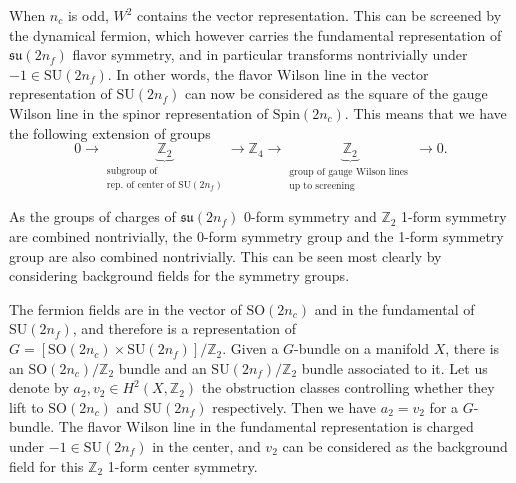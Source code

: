 \documentclass[12pt]{article}
\numberwithin{equation}{section}
\def\bZ{\mathbb{Z}}
\def\SU{\mathrm{SU}}
\def\SO{\mathrm{SO}}
\def\su{\mathfrak{su}}
\def\Spin{\mathrm{Spin}}
\begin{document}
When $n_c$ is odd, $W^2$ contains the vector representation.
This can be screened by the dynamical fermion, which however carries the fundamental representation of $\su(2n_f)$ flavor symmetry, 
and in particular transforms nontrivially under $-1\in \SU(2n_f)$.
In other words, the flavor Wilson line in the vector representation of $\SU(2n_f)$ can now be considered as the square  of the gauge Wilson line in the spinor representation of $\Spin(2n_c)$.
This means that we have the following extension of groups \begin{equation}
0\to \underbrace{\bZ_2}_{\substack{\text{subgroup of}\\
\text{rep.~of center of $\SU(2n_f)$}}}
\to \bZ_4 
\to \underbrace{\bZ_2}_{\substack{\text{group of gauge Wilson lines }\\
\text{up to screening}}} \to 0.
\label{charge-extension}
\end{equation}

As the groups of charges of $\su(2n_f)$ 0-form symmetry and $\bZ_2$ 1-form symmetry are combined nontrivially, 
the 0-form symmetry group and the 1-form symmetry group are also combined nontrivially.
This can be seen most clearly by considering background fields for the symmetry groups.

The fermion fields are in the vector of $\SO(2n_c)$ and in the fundamental of $\SU(2n_f)$, and therefore is a representation of $G=[\SO(2n_c)\times \SU(2n_f)]/\bZ_2$.
Given a $G$-bundle on a manifold $X$,
there is an $\SO(2n_c)/\bZ_2$ bundle and an $\SU(2n_f)/\bZ_2$ bundle associated to it.
Let us denote by $a_2,v_2\in H^2(X,\bZ_2)$ the obstruction classes controlling whether they lift to $\SO(2n_c)$ and $\SU(2n_f)$ respectively. 
Then we have $a_2=v_2$ for a $G$-bundle.
The flavor Wilson line in the fundamental representation is charged under $-1\in \SU(2n_f)$ in the center,
and $v_2$ can be considered as the background field for this $\bZ_2$ 1-form center symmetry.
\end{document}
